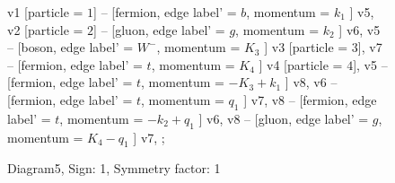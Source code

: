 \documentclass{revtex4}
\begin{document}
\begin{figure}[!htb]
\begin{center}
{    %
v1 [particle = \(1\)] -- [fermion, edge label' = \(b\), momentum = \(k_{1}\) ] v5, 
v2 [particle = \(2\)] -- [gluon, edge label' = \(g\), momentum = \(k_{2}\) ] v6, 
v5 -- [boson, edge label' = \(W^{-}\), momentum = \(K_{3}\) ] v3 [particle = \(3\)], 
v7 -- [fermion, edge label' = \(t\), momentum = \(K_{4}\) ] v4 [particle = \(4\)], 
v5 -- [fermion, edge label' = \(t\), momentum = \(-K_{3} + k_{1}\) ] v8, 
v6 -- [fermion, edge label' = \(t\), momentum = \(q_{1}\) ] v7, 
v8 -- [fermion, edge label' = \(t\), momentum = \(-k_{2} + q_{1}\) ] v6, 
v8 -- [gluon, edge label' = \(g\), momentum = \(K_{4} - q_{1}\) ] v7, 
};
\end{center}
\caption{Diagram5, Sign: 1, Symmetry factor: 1}
\end{figure}
\newpage
\end{document}
